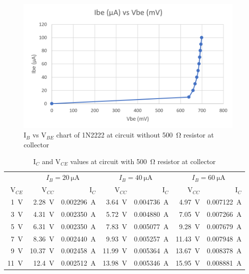 \documentclass{article}
\begin{document}
\begin{figure}[H]
  \centering
  \includegraphics[width=\textwidth]{ECE2200L_Lab5_IV_part1.png}
  \caption{I$_B$ vs V$_{BE}$ chart of 1N2222 at circuit without \SI{500}{\ohm} resistor at collector}
  \label{fig:IV1}
\end{figure}

\newpage

\begin{table}[htbp]
  \centering
  \caption{I$_C$ and V$_{CE}$ values at circuit with \SI{500}{\ohm} resistor at collector}
    \begin{tabular}{rrrrrrr}
      \toprule
          & \multicolumn{2}{c}{$I_{B}=\SI{20}{\micro\ampere}$} & \multicolumn{2}{c}{$I_{B}=\SI{40}{\micro\ampere}$} & \multicolumn{2}{c}{$I_{B}=\SI{60}{\micro\ampere}$} \\
    \multicolumn{1}{r}{V$_{CE}$} & \multicolumn{1}{r}{V$_{CC}$} & \multicolumn{1}{r}{I$_{C}$} & \multicolumn{1}{r}{V$_{CC}$} & \multicolumn{1}{r}{I$_{C}$} & \multicolumn{1}{r}{V$_{CC}$} & \multicolumn{1}{r}{I$_{C}$} \\
    \midrule
    \SI{1 }{\volt}    & \SI{2.28 }{\volt} & \SI{0.002296}{\ampere} & \SI{3.64 }{\volt} & \SI{0.004736}{\ampere} & \SI{4.97 }{\volt} & \SI{0.007122}{\ampere} \\
    \SI{3 }{\volt}    & \SI{4.31 }{\volt} & \SI{0.002350}{\ampere} & \SI{5.72 }{\volt} & \SI{0.004880}{\ampere} & \SI{7.05 }{\volt} & \SI{0.007266}{\ampere} \\
    \SI{5 }{\volt}    & \SI{6.31 }{\volt} & \SI{0.002350}{\ampere} & \SI{7.83 }{\volt} & \SI{0.005077}{\ampere} & \SI{9.28 }{\volt} & \SI{0.007679}{\ampere} \\
    \SI{7 }{\volt}    & \SI{8.36 }{\volt} & \SI{0.002440}{\ampere} & \SI{9.93 }{\volt} & \SI{0.005257}{\ampere} & \SI{11.43}{\volt} & \SI{0.007948}{\ampere} \\
    \SI{9 }{\volt}    & \SI{10.37}{\volt} & \SI{0.002458}{\ampere} & \SI{11.99}{\volt} & \SI{0.005364}{\ampere} & \SI{13.67}{\volt} & \SI{0.008378}{\ampere} \\
    \SI{11}{\volt}    & \SI{12.4 }{\volt} & \SI{0.002512}{\ampere} & \SI{13.98}{\volt} & \SI{0.005346}{\ampere} & \SI{15.95}{\volt} & \SI{0.008881}{\ampere} \\
    \bottomrule
    \end{tabular}%
  \label{tab:IV2}%
\end{table}%
\end{document}
